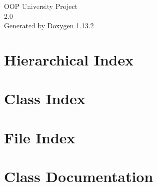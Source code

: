 \documentclass[twoside]{book}
\newcommand{\+}{\discretionary{\mbox{\scriptsize$\hookleftarrow$}}{}{}}
\newcommand{\clearemptydoublepage}{%
    \newpage{\pagestyle{empty}\cleardoublepage}%
  }
\begin{document}
  \raggedbottom
    \hypersetup{pageanchor=false,
                bookmarksnumbered=true,
                pdfencoding=unicode
               }
  \begin{titlepage}
  \vspace*{7cm}
  \begin{center}%
  {\Large OOP University Project}\\
  [1ex]\large 2.\+0 \\
  \vspace*{1cm}
  {\large Generated by Doxygen 1.13.2}\\
  \end{center}
  \end{titlepage}
  \clearemptydoublepage
  \tableofcontents
  \clearemptydoublepage
  \hypersetup{pageanchor=true}
\chapter{Hierarchical Index}

\chapter{Class Index}

\chapter{File Index}

\chapter{Class Documentation}

































\end{document}

